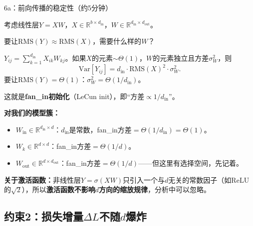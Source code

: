 \documentclass[11pt,a4paper]{article}
\newcommand{\R}{\mathbb{R}}
\begin{document}
\begin{handcalc}{6a：前向传播的稳定性（约5分钟）}

考虑线性层$Y=XW$，$X\in\R^{b\times d_{\text{in}}}$，$W\in\R^{d_{\text{in}}\times d_{\text{out}}}$。

要让$\text{RMS}(Y)\approx\text{RMS}(X)$，需要什么样的$W$？

\tcblower

$Y_{ij} = \sum_{k=1}^{d_{\text{in}}} X_{ik}W_{kj}$。如果$X$的元素$\sim\Theta(1)$，$W$的元素独立且方差$\sigma_W^2$，则
\[
\text{Var}[Y_{ij}] = d_{\text{in}}\cdot\text{RMS}(X)^2\cdot\sigma_W^2.
\]
要让$\text{RMS}(Y)=\Theta(1)$：$\sigma_W^2 = \Theta(1/d_{\text{in}})$。

这就是\textbf{fan\_in初始化}（LeCun init），即``方差$\propto 1/d_{\text{in}}$''。

\textbf{对我们的模型簇：}
\begin{itemize}[leftmargin=*]
\item $W_{\text{in}}\in\R^{d_{\text{in}}\times d}$：$d_{\text{in}}$是常数，fan\_in方差$=\Theta(1/d_{\text{in}})=\Theta(1)$。
\item $W_k\in\R^{d\times d}$：fan\_in方差$=\Theta(1/d)$。
\item $W_{\text{out}}\in\R^{d\times d_{\text{out}}}$：fan\_in方差$=\Theta(1/d)$——但这里有选择空间，先记着。
\end{itemize}

\textbf{关于激活函数：}非线性层$Y=\sigma(XW)$只引入一个与$d$无关的常数因子（如ReLU的$\sqrt{2}$），所以\textbf{激活函数不影响$d$方向的缩放规律}，分析中可以忽略。
\end{handcalc}

\subsection{约束2：损失增量$\Delta L$不随$d$爆炸}
\end{document}
